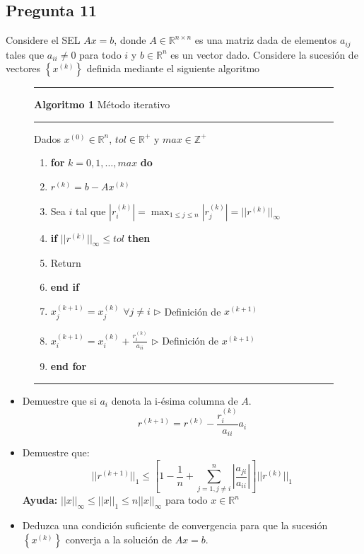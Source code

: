 \documentclass{article}
\def\R{\mbox{\(\mathbb{R}\)}}
\begin{document}
\subsection*{Pregunta 11}
Considere el SEL $Ax=b$, donde $A \in \mathbb{R}^{n\times n}$ es una matriz dada de elementos $a_{ij}$ tales que $a_{ii} \neq 0$ para todo $i$ y $b\in \R^{n}$ es un vector dado. Considere la sucesión de vectores $\left\lbrace x^{(k)}\right\rbrace$ definida mediante el siguiente algoritmo\\
\begin{figure}[h!]
\hrule
\vspace{1mm}
{\bf Algoritmo 1 }Método iterativo
\hrule
\vspace{1mm}
Dados $x^{(0)}\in \R^{n}$, $tol \in \R^+$ y $max \in \mathbb{Z}^+$
\begin{enumerate}[1:]
\item {\bf for} $k=0,1,\dots,max$ {\bf do}
\item \hspace{5mm} $r^{(k)}=b-Ax^{(k)}$
\item \hspace{5mm} Sea $i$ tal que $|r_{i}^{(k)}|=\max_{1\leq j \leq n}|r_{j}^{(k)}|=||r^{(k)}||_{\infty}$
\item \hspace{5mm} {\bf if} $||r^{(k)}||_{\infty}\leq tol$ {\bf then}
\item \hspace{10mm} Return
\item \hspace{5mm} {\bf end if}
\item \hspace{5mm} $x_{j}^{(k+1)}=x_{j}^{(k)}$\hspace{2mm}  $\forall j\neq i$\hspace{20mm} $\triangleright$ Definición de $x^{(k+1)}$
\item \hspace{5mm} $x_{i}^{(k+1)} = x_{i}^{(k)}+\frac{r_{i}^{(k)}}{a_{ii}}$\hspace{22.5mm} $\triangleright$ Definición de $x^{(k+1)}$
\item {\bf end for}
\end{enumerate}
\vspace{1mm}
\hrule
\end{figure}
\begin{itemize}
\item Demuestre que si $a_i$ denota la i-ésima columna de $A$.
$$ r^{(k+1)} = r^{(k)}-\frac{r_{i}^{(k)}}{a_{ii}}a_i$$
\item Demuestre que:
$$||r^{(k+1)}||_1 \leq \left[1-\frac{1}{n}+ \sum_{j=1,j\neq i}^{n}\left|\frac{a_{ji}}{a_{ii}}\right| \right] ||r^{(k)}||_1 $$
{\bf Ayuda:} $||x||_{\infty}\leq ||x||_1 \leq n||x||_{\infty}$ para todo $x\in \R^{n}$
\item Deduzca una condición suficiente de convergencia para que la sucesión $\left\lbrace x^{(k)}\right\rbrace$ converja a la solución de $Ax = b$.
\end{itemize}
\end{document}
